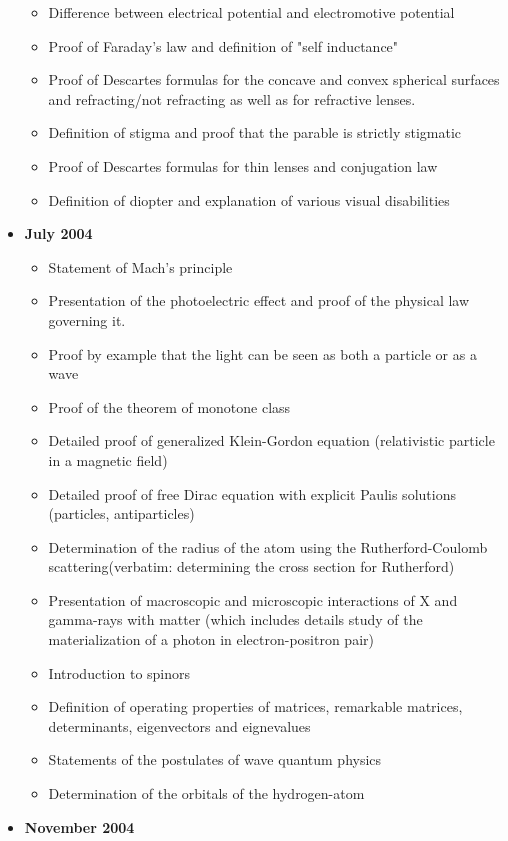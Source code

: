\documentclass[12pt,a4paper,twoside,openright]{report}
\newcounter{def}
\theoremstyle{definition}
\theoremstyle{itexmp}
\numberwithin{equation}{section}
\begin{document}
\begin{itemize}
\begin{itemize}[noitemsep]
				\item Difference between electrical potential and electromotive potential
				\item Proof of Faraday's law and definition of "self inductance"
				\item Proof of Descartes formulas for the concave and convex spherical surfaces and refracting/not refracting as well as for refractive lenses.
				\item Definition of stigma and proof that the parable is strictly stigmatic
				\item Proof of Descartes formulas for thin lenses and conjugation law
				\item Definition of diopter and explanation of various visual disabilities
			\end{itemize}
		\item \textbf{July 2004}
			\begin{itemize}[noitemsep]
			\item Statement of Mach's principle
			\item Presentation of the photoelectric effect and proof of the physical law governing it.
			\item Proof by example that the light can be seen as both a particle or as a wave
			\item Proof of the theorem of monotone class
			\item Detailed proof of generalized Klein-Gordon equation (relativistic particle in a magnetic field) 
			\item Detailed proof of free Dirac equation with explicit Paulis solutions (particles, antiparticles)
			\item Determination of the radius of the atom using the Rutherford-Coulomb scattering(verbatim: determining the cross section for Rutherford)
			\item Presentation of macroscopic and microscopic interactions of X and gamma-rays with matter (which includes details study of the materialization of a photon in electron-positron pair)
			\item Introduction to spinors
			\item Definition of operating properties of matrices, remarkable matrices, determinants, eigenvectors and eignevalues
			\item Statements of the postulates of wave quantum physics
			\item Determination of the orbitals of the hydrogen-atom
			\end{itemize}
		\item \textbf{November 2004}

\end{itemize}
\end{document}
